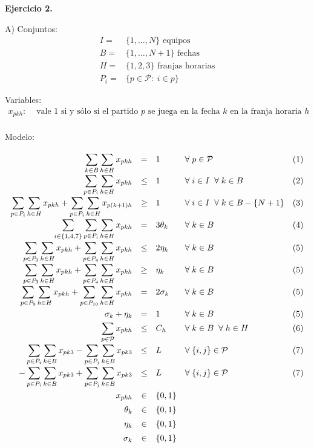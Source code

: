 \documentclass[a4paper,oneside,12pt]{amsart}
\def \ds{\displaystyle}
\begin{document}
\newpage

\textbf{Ejercicio 2.}

A) Conjuntos:
\[
\begin{array}{ll}
    I= & \{1,\dots,N\} \text{ equipos} \\
    B= & \{1,\dots, N+1\} \text{ fechas} \\
    H = & \{1,2,3\} \text{ franjas horarias} \\
    P_i= & \{p\in\mathcal{P}\colon\; i\in p\}
\end{array}
\]

Variables:
\[
\begin{array}{rl}
    x_{pkh}\colon & \text{ vale 1 si y sólo si el partido $p$ se juega en la fecha $k$ en la franja horaria $h$} \\
     & 
\end{array}
\]

Modelo:

\[\def\arraystretch{1.4}
\begin{array}{rcllr}
    \ds\sum_{k \in B}\ds\sum_{h\in H} x_{pkh} & = & 1 & \forall\; p\in \mathcal{P} & (1) \\
    \ds\sum_{p\in P_i}\ds\sum_{h\in H} x_{pkh} & \leq & 1 &  \forall\;i \in I \;\;\forall\;k\in B & (2) \\
    \ds\sum_{p\in P_i}\ds\sum_{h\in H} x_{pkh} + \ds\sum_{p\in P_i}\ds\sum_{h\in H} x_{p(k+1)h} & \geq & 1 & \forall\;i \in I \;\;\forall\;k\in B-\{N+1\} & (3) \\ 
    \ds\sum_{i\in\{1,4,7\}}\sum_{p\in P_i}\sum_{h\in H} x_{pkh} & = & 3\theta_k & \forall\; k\in B & (4) \\ 
    \ds \sum_{p\in P_3}\sum_{h\in H} x_{pkh} + \sum_{p\in P_4}\sum_{h\in H} x_{pkh} & \leq & 2\eta_k & \forall\; k\in B & (5) \\  
    \ds \sum_{p\in P_3}\sum_{h\in H} x_{pkh} + \sum_{p\in P_4}\sum_{h\in H} x_{pkh} & \geq & \eta_k & \forall\; k\in B & (5) \\  
    \ds \sum_{p\in P_9}\sum_{h\in H} x_{pkh} + \sum_{p\in P_{10}}\sum_{h\in H} x_{pkh} & = & 2\sigma_k & \forall\; k\in B & (5) \\
    \sigma_k + \eta_k & = & 1 & \forall\; k\in B & (5) \\
    \ds\sum_{p\in\mathcal{P}} x_{pkh} & \leq & C_h & \forall\;k\in B\;\;\forall\; h \in H & (6) \\
    \ds\sum_{p\in P_i}\sum_{k\in B} x_{pk3} - \ds\sum_{p\in P_j}\sum_{k\in B} x_{pk3} & \leq & L & \forall\;\{i,j\}\in\mathcal{P} & (7) \\
    - \ds\sum_{p\in P_i}\sum_{k\in B} x_{pk3} + \ds\sum_{p\in P_j}\sum_{k\in B} x_{pk3} & \leq & L & \forall\;\{i,j\}\in\mathcal{P} & (7) \\
    x_{pkh} & \in & \{0,1\} & & \\
    \theta_{k} & \in & \{0,1\} & & \\
    \eta_{k} & \in & \{0,1\} & & \\
    \sigma_{k} & \in & \{0,1\} & & \\
\end{array}
\]
\end{document}
